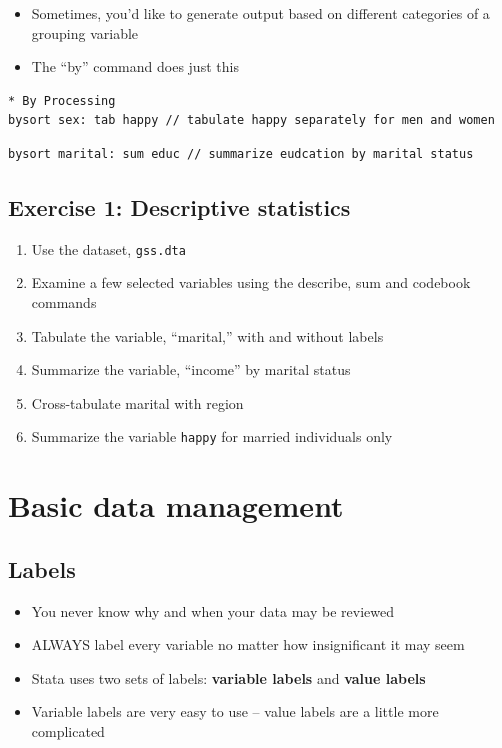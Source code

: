 \documentclass[]{book}
\providecommand{\tightlist}{%
  \setlength{\itemsep}{0pt}\setlength{\parskip}{0pt}}
\begin{document}
\begin{itemize}
\tightlist
\item
  Sometimes, you'd like to generate output based on different categories
  of a grouping variable
\item
  The ``by'' command does just this
\end{itemize}

\begin{verbatim}
* By Processing
bysort sex: tab happy // tabulate happy separately for men and women
\end{verbatim}

\begin{verbatim}
bysort marital: sum educ // summarize eudcation by marital status
\end{verbatim}

\subsection{Exercise 1: Descriptive
statistics}\label{exercise-1-descriptive-statistics}

\begin{enumerate}
\def\labelenumi{\arabic{enumi}.}
\tightlist
\item
  Use the dataset, \texttt{gss.dta}
\item
  Examine a few selected variables using the describe, sum and codebook
  commands
\item
  Tabulate the variable, ``marital,'' with and without labels
\item
  Summarize the variable, ``income'' by marital status
\item
  Cross-tabulate marital with region
\item
  Summarize the variable \texttt{happy} for married individuals only
\end{enumerate}

\section{Basic data management}\label{basic-data-management}

\subsection{Labels}\label{labels}

\begin{itemize}
\tightlist
\item
  You never know why and when your data may be reviewed
\item
  ALWAYS label every variable no matter how insignificant it may seem
\item
  Stata uses two sets of labels: \textbf{variable labels} and
  \textbf{value labels}
\item
  Variable labels are very easy to use -- value labels are a little more
  complicated
\end{itemize}
\end{document}
